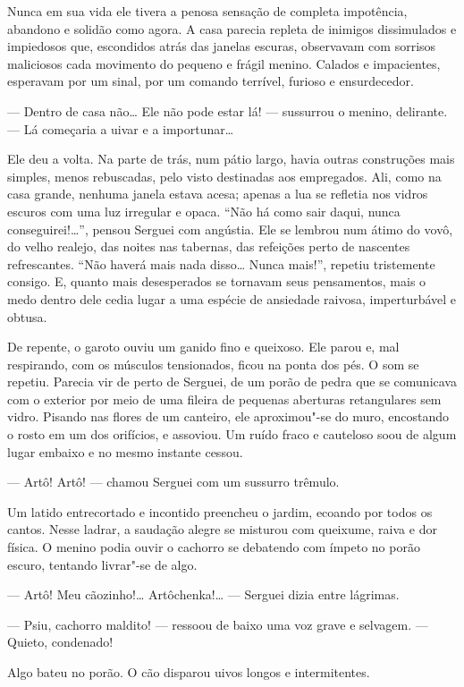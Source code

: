 Nunca em sua vida ele tivera a penosa sensação de completa impotência,
abandono e solidão como agora. A casa parecia repleta de inimigos
dissimulados e impiedosos que, escondidos atrás das janelas escuras,
observavam com sorrisos maliciosos cada movimento do pequeno e frágil
menino. Calados e impacientes, esperavam por um sinal, por um comando
terrível, furioso e ensurdecedor.

--- Dentro de casa não\ldots{} Ele não pode estar lá! --- sussurrou o
menino, delirante. --- Lá começaria a uivar e a importunar\ldots{}

Ele deu a volta. Na parte de trás, num pátio largo, havia outras
construções mais simples, menos rebuscadas, pelo visto destinadas aos
empregados. Ali, como na casa grande, nenhuma janela estava acesa;
apenas a lua se refletia nos vidros escuros com uma luz irregular e
opaca. ``Não há como sair daqui, nunca conseguirei!\ldots{}'', pensou Serguei
com angústia. Ele se lembrou num átimo do vovô, do velho realejo, das
noites nas tabernas, das refeições perto de nascentes refrescantes.
``Não haverá mais nada disso\ldots{} Nunca mais!'', repetiu tristemente
consigo. E, quanto mais desesperados se tornavam seus pensamentos, mais
o medo dentro dele cedia lugar a uma espécie de ansiedade raivosa,
imperturbável e obtusa.

De repente, o garoto ouviu um ganido fino e queixoso. Ele parou e, mal
respirando, com os músculos tensionados, ficou na ponta dos pés. O som
se repetiu. Parecia vir de perto de Serguei, de um porão de pedra que se
comunicava com o exterior por meio de uma fileira de pequenas aberturas
retangulares sem vidro. Pisando nas flores de um canteiro, ele
aproximou"-se do muro, encostando o rosto em um dos orifícios, e
assoviou. Um ruído fraco e cauteloso soou de algum lugar embaixo e no
mesmo instante cessou.

--- Artô! Artô! --- chamou Serguei com um sussurro trêmulo.

Um latido entrecortado e incontido preencheu o jardim, ecoando por todos
os cantos. Nesse ladrar, a saudação alegre se misturou com queixume, raiva
e dor física. O menino podia ouvir o cachorro se debatendo com ímpeto no
porão escuro, tentando livrar"-se de algo.

--- Artô! Meu cãozinho!\ldots{} Artôchenka!\ldots{} --- Serguei dizia entre
lágrimas.

--- Psiu, cachorro maldito! --- ressoou de baixo uma voz grave e
selvagem. --- Quieto, condenado!

Algo bateu no porão. O cão disparou uivos longos e intermitentes.

